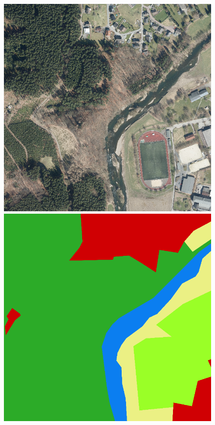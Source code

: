 \begin{figure}
    \vspace{2mm}
    \includegraphics[width=\DiscussionImageWidth]{images/segmentation_discussion/images/3.png} \hfill
    \includegraphics[width=\DiscussionImageWidth]{images/segmentation_discussion/labels/3.png} \hfill

\end{figure}
